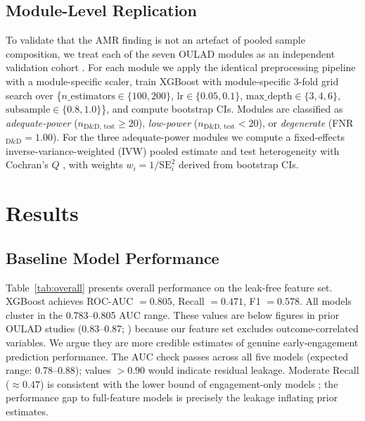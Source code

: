 \documentclass[12pt,a4paper]{article}
\begin{document}
\subsection{Module-Level Replication}
\label{sec:module_method}

To validate that the AMR finding is not an artefact of pooled sample
composition, we treat each of the seven OULAD modules as an independent
validation cohort \citep{gardner2018}. For each module we apply the identical
preprocessing pipeline with a module-specific scaler, train XGBoost with
module-specific 3-fold grid search over \{$n\_\text{estimators} \in
\{100, 200\}$, $\text{lr} \in \{0.05, 0.1\}$, $\text{max\_depth} \in
\{3, 4, 6\}$, $\text{subsample} \in \{0.8, 1.0\}$\}, and compute bootstrap
CIs. Modules are classified as \textit{adequate-power}
($n_{\text{D\&D, test}} \geq 20$), \textit{low-power}
($n_{\text{D\&D, test}} < 20$), or \textit{degenerate}
(FNR$_{\text{D\&D}} = 1.00$). For the three adequate-power modules we compute
a fixed-effects inverse-variance-weighted (IVW) pooled estimate and test
heterogeneity with Cochran's $Q$ \citep{cochran1954}, with weights
$w_i = 1/\text{SE}_i^2$ derived from bootstrap CIs.

\section{Results}

\subsection{Baseline Model Performance}

Table~\ref{tab:overall} presents overall performance on the leak-free feature
set. XGBoost achieves ROC-AUC $= 0.805$, Recall $= 0.471$, F1 $= 0.578$.
All models cluster in the 0.783--0.805 AUC range. These values are below
figures in prior OULAD studies (0.83--0.87; \citealt{opoku2025}) because our
feature set excludes outcome-correlated variables. We argue they are more
credible estimates of genuine early-engagement prediction performance. The
AUC check passes across all five models (expected range: 0.78--0.88); values
$> 0.90$ would indicate residual leakage. Moderate Recall ($\approx 0.47$)
is consistent with the lower bound of engagement-only models
\citep{bakhshinategh2018}; the performance gap to full-feature models is
precisely the leakage inflating prior estimates.
\end{document}
